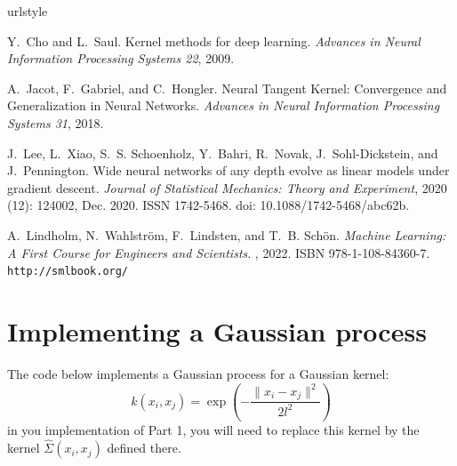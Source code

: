 \documentclass[a4paper,10pt]{article}
\begin{document}
\begin{thebibliography}{4}
\providecommand{\natexlab}[1]{#1}
\providecommand{\url}[1]{\texttt{#1}}
\expandafter\ifx\csname urlstyle\endcsname\relax
  \providecommand{\doi}[1]{doi: #1}\else
  \providecommand{\doi}{doi: \begingroup \urlstyle{rm}\Url}\fi

Y.~Cho and L.~Saul.
\newblock Kernel methods for deep learning.
\newblock \emph{Advances in Neural Information Processing
  Systems 22}, 2009.

A.~Jacot, F.~Gabriel, and C.~Hongler.
\newblock Neural {{Tangent Kernel}}: Convergence and {{Generalization}} in
  {{Neural Networks}}.
\newblock \emph{Advances in Neural Information Processing Systems 31}, 2018.

J.~Lee, L.~Xiao, S.~S. Schoenholz, Y.~Bahri, R.~Novak, J.~{Sohl-Dickstein}, and
  J.~Pennington.
\newblock Wide neural networks of any depth evolve as linear models under
  gradient descent.
\newblock \emph{Journal of Statistical Mechanics: Theory and Experiment},
  2020 (12): 124002, Dec. 2020.
\newblock ISSN 1742-5468.
\newblock \doi{10.1088/1742-5468/abc62b}.

A.~Lindholm, N.~Wahlstr{\"o}m, F.~Lindsten, and T.~B. Sch{\"o}n.
\newblock \emph{Machine {{Learning}}: A {{First Course}} for {{Engineers}} and
  {{Scientists}}}.
, 2022.
\newblock ISBN 978-1-108-84360-7.
\newblock \url{http://smlbook.org/}

\end{thebibliography}


\appendix
\section{Implementing a Gaussian process}
\label{sec:gp}

The code below implements a Gaussian process for a Gaussian kernel:
\begin{equation}
    k(x_i, x_j) = \exp\left(-\frac{\|x_i - x_j\|^2}{2 l^2}\right)
\end{equation}
in you implementation of Part 1, you will need to replace this kernel by the kernel $\hat{\Sigma}(x_i, x_j)$ defined there.
\end{document}
